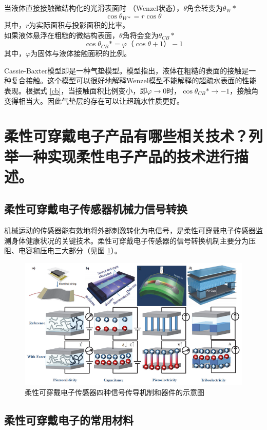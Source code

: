 \documentclass[UTF8,9pt]{ctexart}
\newcommand\vp{\varphi}                                                %
\renewcommand\t{\theta}                                                %
\newcommand\se{\section}                                               %
\newcommand\sub{\subsection}                                           %
\begin{document}
 当液体直接接触微结构化的光滑表面时 （Wenzel状态），$\t$角会转变为$\theta _{W}*$
 $$ 
\cos \theta_{W*}=r \cos \theta
 $$
 其中，$r$为实际面积与投影面积的比率。\\
 如果液体悬浮在粗糙的微结构表面，$\t$角将会变为$\theta _{{CB}}*$
\begin{equation}
\cos \theta_{C B} *=\varphi（\cos \theta+1）-1 \label{cb}
\end{equation}
 其中，$\vp$为固体与液体接触面积的比例。

Cassie-Baxter模型即是一种气垫模型。模型指出，液体在粗糙的表面的接触是一种复合接触。这个模型可以很好地解释Wenzel模型不能解释的超疏水表面的性能表现。根据式 \ref{cb}，当接触面积比例变小，即$\vp\rightarrow 0$时，$\cos \theta_{C B} *\rightarrow -1$，接触角变得相当大。因此气垫层的存在可以让超疏水性质更好。
\se{柔性可穿戴电子产品有哪些相关技术？列举一种实现柔性电子产品的技术进行描述。}
\sub{柔性可穿戴电子传感器机械力信号转换}
机械运动的传感器能有效地将外部刺激转化为电信号，是柔性可穿戴电子传感器监测身体健康状况的关键技术。柔性可穿戴电子传感器的信号转换机制主要分为压阻、电容和压电三大部分（见图 \ref{rx}）。
\begin{figure}[htbp]
    \centering
    \includegraphics[scale=0.4]{10.png}
    \caption{柔性可穿戴电子传感器四种信号传导机制和器件的示意图}
    \label{rx} 
\end{figure}
\sub{柔性可穿戴电子的常用材料}
\end{document}
